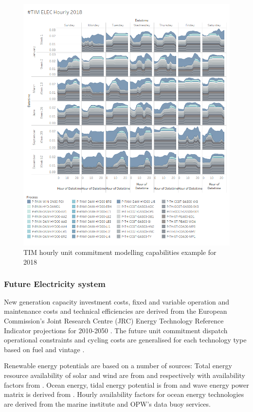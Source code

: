 \documentclass[journal abbreviation, manuscript]{copernicus}
\begin{document}
\begin{figure}[!htbp]
 \centering
 \includegraphics[scale=0.6]{TIM_Elec_Hourly (2).png} 
 \caption{TIM hourly unit commitment modelling capabilities example for 2018}
 \label{fig:TIM_HourlyELC}
\end{figure}

\subsubsection{Future Electricity system}
New generation capacity investment costs, fixed and variable operation and maintenance costs and technical efficiencies are derived from the European Commission's Joint Research Centre (JRC) Energy Technology Reference Indicator projections for 2010-2050 \citep{Carlsson2014}. The future unit commitment dispatch operational constraints and cycling costs are generalised for each technology type based on fuel and vintage \citep{Kumar2012}. 

Renewable energy potentials are based on a number of sources: Total energy resource availability of solar and wind are from \citep{Pfenninger2016} and \citep{Staffell2016} respectively with availability factors from \citep{Ruiz2019}. Ocean energy, tidal energy potential is from \citep{ORourke2010} and wave energy power matrix is derived from \citep{Nambiar2016}. Hourly availability factors for ocean energy technologies are derived from the marine institute and OPW's data buoy services.
\end{document}
